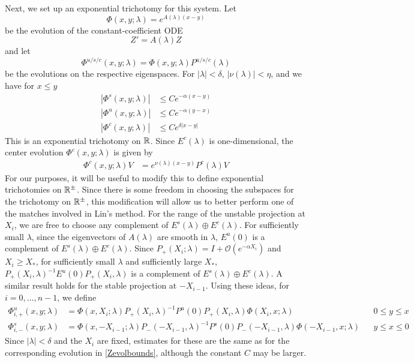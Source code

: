 \documentclass[thesis.tex]{subfiles}
\begin{document}
Next, we set up an exponential trichotomy for this system. Let
\begin{equation}
\Phi(x, y; \lambda) = e^{A(\lambda)(x-y)}
\end{equation}
be the evolution of the constant-coefficient ODE
\begin{equation}\label{constcoeffZ}
Z' = A(\lambda) Z
\end{equation}
and let 
\begin{equation}\label{Zevoltri}
\Phi^{u/s/c}(x, y; \lambda) = \Phi(x, y; \lambda)P^{u/s/c}(\lambda)
\end{equation}
be the evolutions on the respective eigenspaces. For $|\lambda| < \delta$, $|\nu(\lambda)| < \eta$, and we have for $x \leq y$
\begin{equation}\label{Zevolbounds}
\begin{aligned}
|\Phi^s(x, y; \lambda)| &\leq C e^{-\alpha(x - y)} \\
|\Phi^u(x, y; \lambda)| &\leq C e^{-\alpha(y - x)} \\
|\Phi^c(x, y; \lambda)| &\leq C e^{\delta|x - y|} 
\end{aligned}
\end{equation}
This is an exponential trichotomy on $\mathbb{R}$. Since $E^c(\lambda)$ is one-dimensional, the center evolution $\Phi^c(x, y; \lambda)$ is given by
\begin{align}\label{centerevol}
\Phi^c(x, y; \lambda) V &= e^{\nu(\lambda)(x - y)} P^c(\lambda)V
\end{align}
For our purposes, it will be useful to modify this to define exponential trichotomies on $\mathbb{R}^\pm$. Since there is some freedom in choosing the subspaces for the trichotomy on $\mathbb{R}^\pm$, this modification will allow us to better perform one of the matches involved in Lin's method. For the range of the unstable projection at $X_i$, we are free to choose any complement of $E^s(\lambda) \oplus E^c(\lambda)$. For sufficiently small $\lambda$, since the eigenvectors of $A(\lambda)$ are smooth in $\lambda$, $E^u(0)$ is a complement of $E^s(\lambda)\oplus E^c(\lambda)$. Since $P_+(X_i; \lambda) = I + \mathcal{O}(e^{-\alpha X_i})$ and $X_i \geq X_*$, for sufficiently small $\lambda$ and sufficiently large $X_*$, $P_+(X_i, \lambda)^{-1} E^u(0) P_+(X_i, \lambda)$ is a complement of $E^s(\lambda) \oplus E^c(\lambda)$. A similar result holds for the stable projection at $-X_{i-1}$. Using these ideas, for $i = 0, \dots, n-1$, we define
\begin{equation}\label{Zevolmod}
\begin{aligned}
\Phi^u_{i,+}(x, y; \lambda) &= \Phi(x, X_i; \lambda) P_+(X_i, \lambda)^{-1}
P^u(0) P_+(X_i, \lambda) \Phi(X_i, x; \lambda) && 0 \leq y \leq x \\
\Phi^s_{i,-}(x, y; \lambda) &= \Phi(x, -X_{i-1}; \lambda) P_-(-X_{i-1}, \lambda)^{-1}
P^s(0) P_-(-X_{i-1}, \lambda) \Phi(-X_{i-1}, x; \lambda) && y \leq x \leq 0
\end{aligned}
\end{equation}
Since $|\lambda| < \delta$ and the $X_i$ are fixed, estimates for these are the same as for the corresponding evolution in \cref{Zevolbounds}, although the constant $C$ may be larger.
\end{document}
